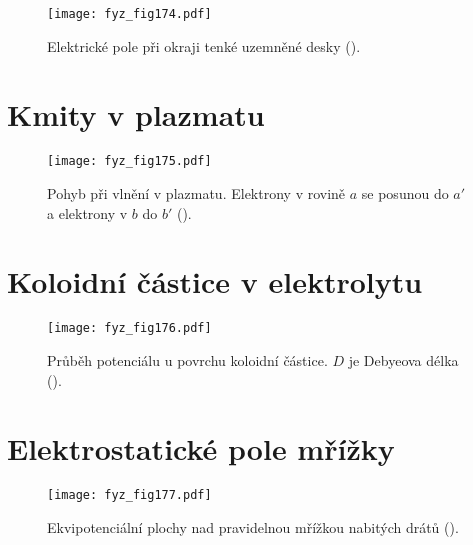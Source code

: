 {  \begin{figure}[ht!]  %
    \centering
    \texttt{[image: fyz\_fig174.pdf]}
    \caption{Elektrické pole při okraji tenké uzemněné desky
             (\cite[s.~128]{Feynman02}).}
    \label{fyz:fig174}
  \end{figure}
  
\section{Kmity v plazmatu}\label{fyz:IIchapVsecXXIV}

  \begin{figure}[ht!]  %
    \centering
    \texttt{[image: fyz\_fig175.pdf]}
    \caption{Pohyb při vlnění v plazmatu. Elektrony v rovině \(a\) se posunou do \(a'\) a 
             elektrony v \(b\) do \(b'\)
             (\cite[s.~130]{Feynman02}).}
    \label{fyz:fig175}
  \end{figure}
  
\section{Koloidní částice v elektrolytu}\label{fyz:IIchapVsecXXV}

  \begin{figure}[ht!]  %
    \centering
    \texttt{[image: fyz\_fig176.pdf]}
    \caption{Průběh potenciálu u povrchu koloidní částice. \(D\) je Debyeova délka
             (\cite[s.~134]{Feynman02}).}
    \label{fyz:fig176}
  \end{figure}
  
\section{Elektrostatické pole mřížky}\label{fyz:IIchapVsecXXVI}

  \begin{figure}[ht!]  %
    \centering
    \texttt{[image: fyz\_fig177.pdf]}
    \caption{Ekvipotenciální plochy nad pravidelnou mřížkou nabitých drátů
             (\cite[s.~136]{Feynman02}).}
    \label{fyz:fig177}
  \end{figure}
  
} %
\printbibliography[title={Seznam literatury}, heading=subbibliography]
